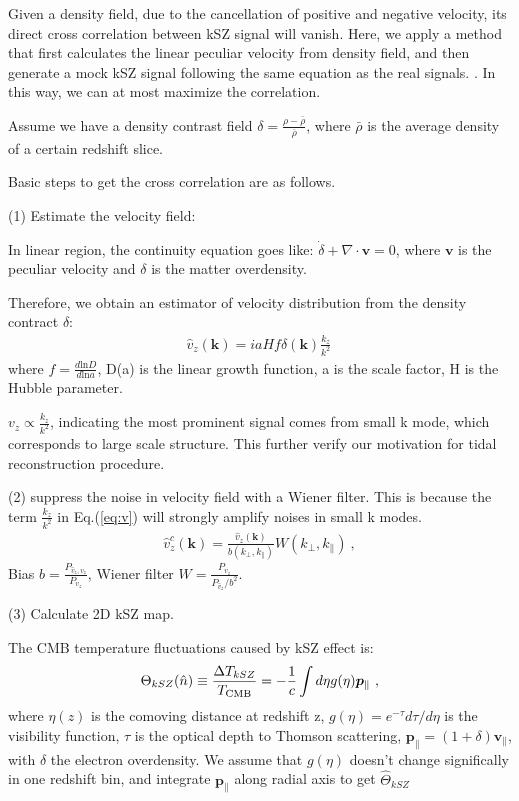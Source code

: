 Given a density field, due to the cancellation of positive and negative velocity, its direct cross correlation between kSZ signal will vanish.
Here, we apply a method that first calculates the linear peculiar velocity from density field, and then generate a mock kSZ signal following the same equation as the real signals. 
\cite{Shao11}.
In this way, we can at most maximize the correlation.

Assume we have a density contrast field $\delta=\frac{\rho-\bar{\rho}}{\bar{\rho}}$, where $\bar\rho$ is the average density of a certain redshift slice. 

Basic steps to get the cross correlation are as follows.

(1) Estimate the velocity field:

In linear region, the continuity equation goes like:
$\dot \delta+\nabla \cdot \bm{v}=0$, 
where $\bm{v}$ is the peculiar velocity and $\delta$ is the matter overdensity. 

Therefore, we obtain an estimator of velocity distribution from the density contract $\delta$:
\begin{eqnarray}
	\label{eq:v}
\hat v_z(\bm{k})=i a H f\delta(\bm{k})\frac{k_z}{k^2}\,
\end{eqnarray}
where $f=\frac{d\mathrm{ln}D}{d\mathrm{ln}a}$, D(a) is the linear growth function, 
a is the scale factor, H is the Hubble parameter.

$v_z \propto \frac{k_z}{k^2}$, indicating the most prominent signal comes from small k mode, which corresponds to large scale structure. 
This further verify our motivation for tidal reconstruction procedure.

(2) suppress the noise in velocity field with a Wiener filter. 
This is because the term $\frac{k_z}{k^2}$ in Eq.(\ref{eq:v}) will strongly amplify noises in small k modes. 
\begin{eqnarray}
	\label{eq:wienerv}
\hat v_z^c(\bm{k})=\frac{\hat v_z(\bm{k})}{b(k_\perp,k_\parallel)}W(k_\perp,k_\parallel)\ ,
\end{eqnarray}
Bias $b=\frac{P_{\hat v_z,v_z}}{P_{v_z}}$, Wiener filter $W=\frac{P_{v_z}}{P_{\hat v_z}/b^2}$.

(3) Calculate 2D kSZ map.

The CMB temperature fluctuations caused by kSZ effect is:
\begin{eqnarray}
\label{eq:ksz}
\Theta_{kSZ}(\hat n)\equiv\frac{\Delta T_{kSZ}}{T_{\mathrm{CMB}}}
=-\frac{1}{c}\int d\eta  g(\eta)  \bm{p}_\parallel\ ,
\end{eqnarray}
where $\eta(z)$ is the comoving distance at redshift z, $g(\eta)=e^{-\tau} d\tau/d\eta$ is the visibility function, $\tau$ is the optical depth to Thomson scattering, $\bm{p}_\parallel=(1+\delta)\bm{v}_\parallel$, with $\delta$ the electron overdensity. 
We assume that $g(\eta)$ doesn't change significally in one redshift bin, 
and integrate $\bm{p}_\parallel$ along radial axis to get $\hat \Theta_{kSZ}$

